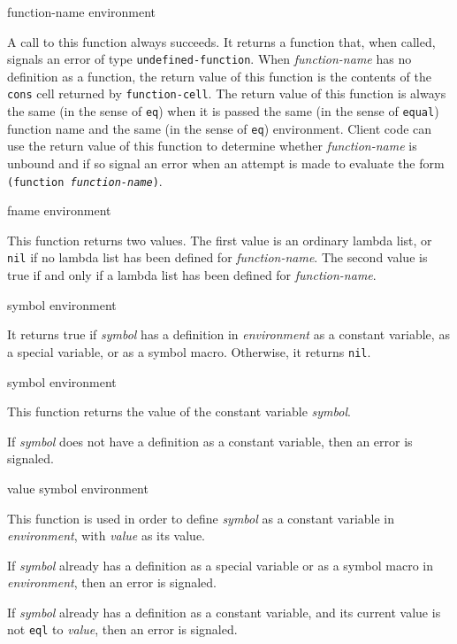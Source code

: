  {function-name environment}

A call to this function always succeeds.  It returns a function that,
when called, signals an error of type \texttt{undefined-function}.
When \textit{function-name} has no definition as a function, the
return value of this function is the contents of the \texttt{cons}
cell returned by \texttt{function-cell}.  The return value of this
function is always the same (in the sense of \texttt{eq}) when it is
passed the same (in the sense of \texttt{equal}) function name and the
same (in the sense of \texttt{eq}) environment.  Client code can use
the return value of this function to determine whether
\textit{function-name} is unbound and if so signal an error when an
attempt is made to evaluate the form \texttt{(function
  \textrm{\textit{function-name}})}.

 {fname environment}

This function returns two values.  The first value is an ordinary
lambda list, or \texttt{nil} if no lambda list has been defined for
\textit{function-name}.  The second value is true if and only if a
lambda list has been defined for \textit{function-name}.

 {symbol environment}

It returns true if \textit{symbol} has a definition in
\textit{environment} as a constant variable, as a special variable, or
as a symbol macro.  Otherwise, it returns \texttt{nil}.

 {symbol environment}

This function returns the value of the constant variable
\textit{symbol}.

If \textit{symbol} does not have a definition as a constant variable,
then an error is signaled.

 {value symbol environment}

This function is used in order to define \textit{symbol} as a constant
variable in \textit{environment}, with \textit{value} as its value.

If \textit{symbol} already has a definition as a special variable or
as a symbol macro in \textit{environment}, then an error is signaled.

If \textit{symbol} already has a definition as a constant variable,
and its current value is not \texttt{eql} to \textit{value}, then an
error is signaled.

